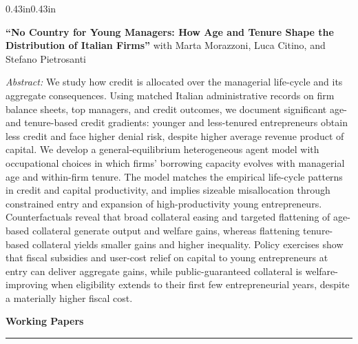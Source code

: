 \documentclass[10pt,a4paper]{article}
\newenvironment{cvbody}
  {\begin{adjustwidth}{0.43in}{0.43in}}
  {\end{adjustwidth}}
\newcommand{\cvsection}[1]{%
  \vspace{9pt}%
  {\large\bfseries #1}\par
  \vspace{3pt}\hrule\vspace{5pt}%
}
\newcommand{\paper}[3]{%
  \textbf{``#1''}#2\par
  \vspace{3pt}
  {\fontsize{8.3}{9.6}\selectfont\textit{Abstract:} #3\par}
  \vspace{6pt}
}
\begin{document}
\begin{cvbody}
\vspace{4pt}

  \paper{No Country for Young Managers: How Age and Tenure Shape the Distribution of Italian Firms}{ with Marta Morazzoni, Luca Citino, and Stefano Pietrosanti}{We study how credit is allocated over the managerial life-cycle and its aggregate consequences. Using matched Italian administrative records on firm balance sheets, top managers, and credit outcomes, we document significant age- and tenure-based credit gradients: younger and less-tenured entrepreneurs obtain less credit and face higher denial risk, despite higher average revenue product of capital. We develop a general-equilibrium heterogeneous agent model with occupational choices in which firms' borrowing capacity evolves with managerial age and within-firm tenure. The model matches the empirical life-cycle patterns in credit and capital productivity, and implies sizeable misallocation through constrained entry and expansion of high-productivity young entrepreneurs. Counterfactuals reveal that broad collateral easing and targeted flattening of age-based collateral generate output and welfare gains, whereas flattening tenure-based collateral yields smaller gains and higher inequality. Policy exercises show that fiscal subsidies and user-cost relief on capital to young entrepreneurs at entry can deliver aggregate gains, while public-guaranteed collateral is welfare-improving when eligibility extends to their first few entrepreneurial years, despite a materially higher fiscal cost.}

\end{cvbody}

\newpage


\vspace{4pt}
\cvsection{Working Papers}

\vspace{4pt}
\end{document}
